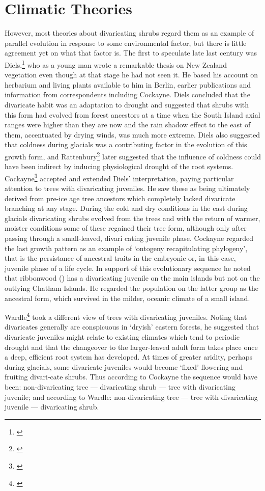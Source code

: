 \section{Climatic Theories}

However, most theories about divaricating shrubs regard them as an example of parallel evolution in response to some environmental factor, but there is little agreement yet on what that factor is.
The first to speculate late last century was Diels,\footnote{\cite{diels1897vegetations}} who as a young man wrote a remarkable thesis on New Zealand vegetation even though at that stage he had not seen it.
He based his account on herbarium and living plants available to him in Berlin, earlier publications and information from correspondents including Cockayne.
Diels concluded that the divaricate habit was an adaptation to drought and suggested that shrubs with this form had evolved from forest ancestors at a time when the South Island axial ranges were higher than they are now and the rain shadow effect to the east of them, accentuated by drying winds, was much more extreme.
Diels also suggested that coldness during glacials was a contributing factor in the evolution of this growth form, and Rattenbury\footnote{\cite{rattenbury1962cyclic}} later suggested that the influence of coldness could have been indirect by inducing physiological drought of the root systems.
Cockayne\footnote{\cite{cockayne1912observations}} accepted and extended Diels' interpretation, paying particular attention to trees with divaricating juveniles.
He saw these as being ultimately derived from pre-ice age tree ancestors which completely lacked divaricate branching at any stage.
During the cold and dry conditions in the east during glacials divaricating shrubs evolved from the trees and with the return of warmer, moister conditions some of these regained their tree form, although only after passing through a small-leaved, divari cating juvenile phase.
Cockayne regarded the last growth pattern as an example of `ontogeny recapitulating phylogeny', that is the persistance of ancestral traits in the embryonic or, in this case, juvenile phase of a life cycle.
In support of this evolutionary sequence he noted that ribbonwood () has a divaricating juvenile on the main islands but not on the outlying Chatham Islands.
He regarded the population on the latter group as the ancestral form, which survived in the milder, oceanic climate of a small island.

Wardle\footnote{\cite{wardle1963evolution}} took a different view of trees with divaricating juveniles.
Noting that divaricates generally are conspicuous in `dryish' eastern forests, he suggested that divaricate juveniles might relate to existing climates which tend to periodic drought and that the changeover to the larger-leaved adult form takes place once a deep, efficient root system has developed.
At times of greater aridity, perhaps during glacials, some divaricate juveniles would become `fixed' flowering and fruiting divari-cate shrubs.
Thus according to Cockayne the sequence would have been: non-divaricating tree — divaricating shrub — tree with divaricating juvenile; and according to Wardle: non-divaricating tree — tree with divaricating juvenile — divaricating shrub.

